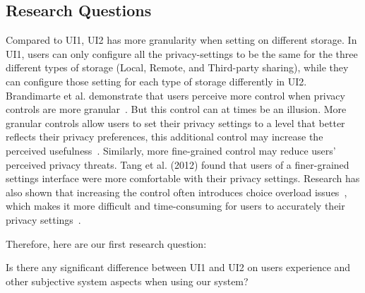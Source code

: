\subsection{Research Questions}
%

Compared to UI1, UI2 has more granularity when setting on different storage. In UI1, users can only configure all the privacy-settings to be the same for the three different types of storage (Local, Remote, and Third-party sharing), while they can configure those setting for each type of storage differently in UI2. Brandimarte et al. demonstrate that users perceive more control when privacy controls are more granular~\cite{brandimarte2013misplaced}. But this control can at times be an illusion. More granular controls allow users to set their privacy settings to a level that better reflects their privacy preferences, this additional control may increase the perceived usefulness~\cite{tang2012implications, al2016modeling}. Similarly, more fine-grained control may reduce users' perceived privacy threats. Tang et al. (2012) found that users of a finer-grained settings interface were more comfortable with their privacy settings. Research has also shown that increasing the control often introduces choice overload issues~\cite{iyengar2000choice, schwartz2004paradox, acquisti2005privacy, acquisti2007can}, which makes it more difficult and time-consuming for users to accurately their privacy settings~\cite{madejski2012study, sadeh2009understanding}.

Therefore, here are our first research question:
\theoremgroup
\begin{theorem}
	Is there any significant difference between UI1 and UI2 on users experience and other subjective system aspects when using our system?
\end{theorem}

